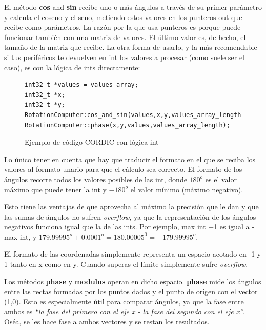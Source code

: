 \documentclass{report}
\begin{document}
\par \vspace{0.3cm}
El método \textbf{cos} and \textbf{sin} recibe uno o más ángulos a través de su primer parámetro y calcula el coseno y el seno, metiendo estos valores en los punteros out que recibe como parámetros. La razón por la que usa punteros es porque puede funcionar también con una matriz de valores. El último valor es, de hecho, el tamaño de la matriz que recibe. La otra forma de usarlo, y la más recomendable si tus periféricos te devuelven en int los valores a procesar (como suele ser el caso), es con la lógica de ints directamente:
\begin{figure}[h]
\begin{lstlisting}
int32_t *values = values_array;
int32_t *x;
int32_t *y;
RotationComputer:cos_and_sin(values,x,y,values_array_length);
RotationComputer::phase(x,y,values,values_array_length);
\end{lstlisting}
\caption{Ejemplo de código CORDIC con lógica int}
  \label{CORDICwIntcode}
\end{figure}
\par \vspace{0.3cm}
Lo único tener en cuenta que hay que traducir el formato en el que se reciba los valores al formato unario para que el cálculo sea correcto. El formato de los ángulos recorre todos los valores posibles de las int, donde $180^o$ es el valor máximo que puede tener la int y $-180^o$ el valor mínimo (máximo negativo). \par 
Esto tiene las ventajas de que aprovecha al máximo la precisión que le dan y que las sumas de ángulos no sufren \textit{overflow}, ya que la representación de los ángulos negativos funciona igual que la de las ints. Por ejemplo, max int +1 es igual a -max int, y $179.99995^o + 0.0001^o = 180.00005^0 = -179.99995^o$. \par
El formato de las coordenadas simplemente representa un espacio acotado en -1 y 1 tanto en x como en y. Cuando superas el límite simplemente sufre \textit{overflow}. \par \vspace{0.3cm}
Los métodos \textbf{phase} y \textbf{modulus} operan en dicho espacio. \textbf{phase} mide los ángulos entre las rectas formadas por los puntos dados y el punto de origen con el vector (1,0). Esto es especialmente útil para comparar ángulos, ya que la fase entre ambos es \textit{``la fase del primero con el eje x - la fase del segundo con el eje x''}. Oséa, se les hace fase a ambos vectores y se restan los resultados. \par
\end{document}
